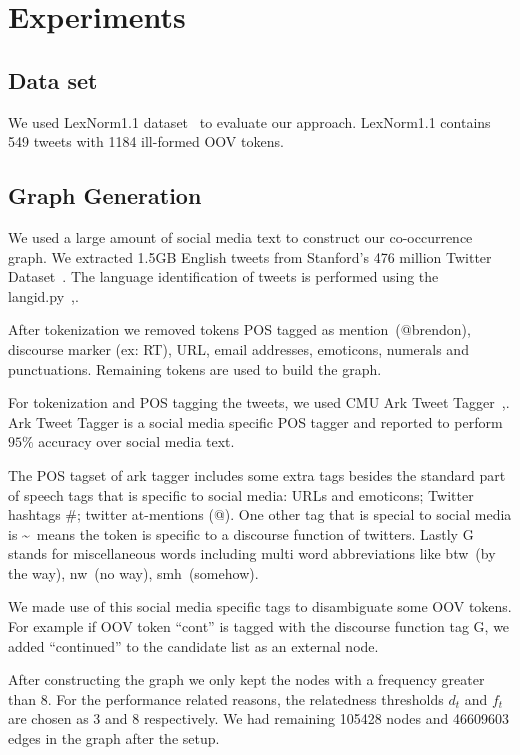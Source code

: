 \section{Experiments}
\label{sec:experiments}

\subsection{Data set}
We used LexNorm1.1 dataset~\cite{Han:2011:LNS:2002472.2002520} to evaluate our approach. LexNorm1.1 contains 549 tweets with 1184 ill-formed OOV tokens.

\subsection{Graph Generation}
We used a large amount of social media text to construct our co-occurrence graph. We extracted 1.5GB English tweets from Stanford's 476 million Twitter Dataset~\cite{DBLP:conf/wsdm/YangL11}. The language identification of tweets is performed using the langid.py~\cite{Lui:2012:LOL:2390470.2390475},\cite{Baldwin:2010:LIL:1857999.1858026}.

After tokenization we removed tokens POS tagged as mention~(@brendon), discourse marker (ex: RT), URL, email addresses, emoticons, numerals and punctuations. Remaining tokens are used to build the graph.

For tokenization and POS tagging the tweets, we used CMU Ark Tweet Tagger~\cite{DBLP:conf/naacl/OwoputiODGSS13},\cite{Gimpel:2011:PTT:2002736.2002747}. Ark Tweet Tagger is a social media specific POS tagger and reported to perform $95\%$ accuracy over social media text.

The POS tagset of ark tagger includes some extra tags besides the standard part of speech tags that is specific to social media: URLs and emoticons; Twitter hashtags \#; twitter at-mentions (@). One other tag that is special to social media is \textasciitilde~means the token is specific to a discourse function of twitters. Lastly G stands for miscellaneous words including multi word abbreviations like btw~(by the way), nw~(no way), smh~(somehow).

We made use of this social media specific tags to disambiguate some OOV tokens. For example if OOV token ``cont'' is tagged with the discourse function tag G, we added ``continued'' to the candidate list as an external node.

After constructing the graph we only kept the nodes with a frequency greater than 8. For the performance related reasons, the relatedness thresholds $d_t$ and $f_t$  are chosen as 3 and 8 respectively. We had remaining 105428 nodes and 46609603 edges in the graph after the setup.

